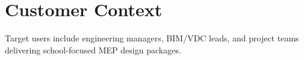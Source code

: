 \section{Customer Context}
Target users include engineering managers, BIM/VDC leads, and project teams delivering school-focused MEP design packages.

